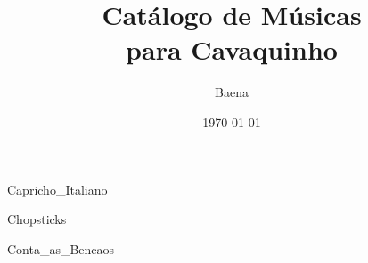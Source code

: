 \documentclass{scrartcl}
\begin{document}
\title{\textbf{\Huge Catálogo de Músicas\\ para Cavaquinho}}
\author{Baena}
\date{\today}
\maketitle
\thispagestyle{empty}
\newpage


\begin{multicols}{2}
\tableofcontents
\end{multicols}

\cleardoublepage
{}















{Capricho_Italiano}


{Chopsticks}


{Conta_as_Bencaos}
\end{document}
